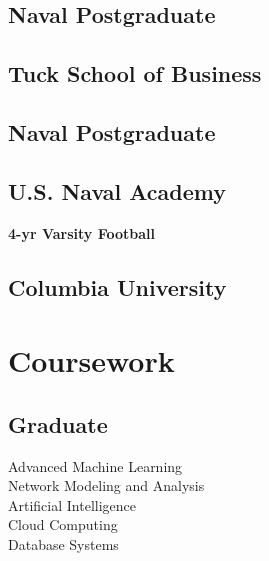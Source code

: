 \documentclass[]{Forester-Resume}
\begin{document}
\begin{minipage}[t]{0.33\textwidth}
\subsection{Naval Postgraduate}

\sectionsep 
\subsection{Tuck School of Business}

\sectionsep
\subsection{Naval Postgraduate}

\sectionsep
\subsection{U.S. Naval Academy}
\textbf{4-yr Varsity Football}

\sectionsep
\subsection{Columbia University}


\sectionsep
\section{Coursework}
\subsection{Graduate}
Advanced Machine Learning \\
Network Modeling and Analysis \\
Artificial Intelligence \\
Cloud Computing \\
Database Systems\\


\end{minipage}
\end{document}
